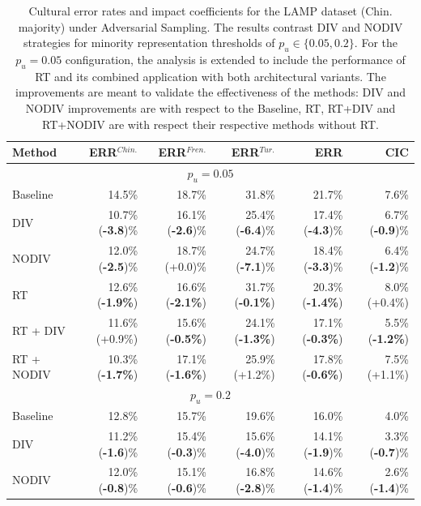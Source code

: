 \begin{table}
\centering
\small
\begin{tabular}{lrrrrr}
\toprule
\textbf{Method} & \textbf{ERR$^{Chin.}$} & \textbf{ERR$^{Fren.}$} & \textbf{ERR$^{Tur.}$} & \textbf{ERR} & \textbf{CIC} \\
\midrule
\multicolumn{6}{c}{$p_u=0.05$} \\
\midrule
Baseline & 14.5\%&	18.7\%& 31.8\%&	21.7\%&	7.6\%\\	
DIV          & 10.7\% (\textbf{-3.8})\% & 16.1\% (\textbf{-2.6})\% & 25.4\% (\textbf{-6.4})\% & 17.4\% (\textbf{-4.3})\% & 6.7\% (\textbf{-0.9})\% \\
NODIV        & 12.0\% (\textbf{-2.5})\% & 18.7\% (+0.0)\% & 24.7\% (\textbf{-7.1})\% & 18.4\% (\textbf{-3.3})\% & 6.4\% (\textbf{-1.2})\% \\
\midrule
RT              & 12.6\% (\textbf{-1.9\%}) & 16.6\% (\textbf{-2.1\%}) & 31.7\% (\textbf{-0.1\%}) & 20.3\% (\textbf{-1.4\%}) & 8.0\% (+0.4\%) \\
RT + DIV        & 11.6\% (+0.9\%) & 15.6\% (\textbf{-0.5\%}) & 24.1\% (\textbf{-1.3\%}) & 17.1\% (\textbf{-0.3\%}) & 5.5\% (\textbf{-1.2\%}) \\
RT + NODIV      & 10.3\% (\textbf{-1.7\%}) & 17.1\% (\textbf{-1.6\%}) & 25.9\% (+1.2\%) & 17.8\% (\textbf{-0.6\%}) & 7.5\% (+1.1\%) \\
\midrule
\multicolumn{6}{c}{$p_u=0.2$} \\
\midrule
Baseline & 12.8\% & 15.7\% & 19.6\% & 16.0\% & 4.0\% \\
DIV          & 11.2\% (\textbf{-1.6})\% & 15.4\% (\textbf{-0.3})\% & 15.6\% (\textbf{-4.0})\% & 14.1\% (\textbf{-1.9})\% & 3.3\% (\textbf{-0.7})\% \\
NODIV        & 12.0\% (\textbf{-0.8})\% & 15.1\% (\textbf{-0.6})\% & 16.8\% (\textbf{-2.8})\% & 14.6\% (\textbf{-1.4})\% & 2.6\% (\textbf{-1.4})\% \\
\bottomrule
\end{tabular}
\caption{Cultural error rates and impact coefficients for the LAMP dataset (Chin. majority) under Adversarial Sampling. The results contrast DIV and NODIV strategies for minority representation thresholds of $p_u \in \{0.05, 0.2\}$. For the $p_u = 0.05$ configuration, the analysis is extended to include the performance of RT and its combined application with both architectural variants. The improvements are meant to validate the effectiveness of the methods: DIV and NODIV improvements are with respect to the Baseline, RT, RT+DIV and RT+NODIV are with respect their respective methods without RT.}
\label{ch3:tab:ADVLC}
\end{table}
